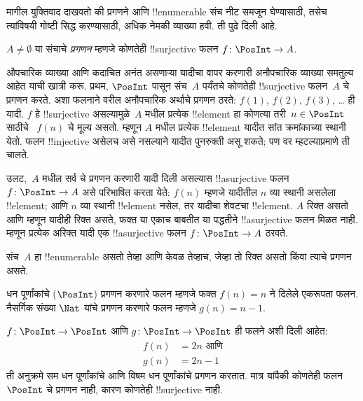 \documentclass[../../../include/open-logic-section]{subfiles}
\begin{document}
मागील युक्तिवाद दाखवतो की प्रगणने आणि !!{enumerable} संच नीट
समजून घेण्यासाठी, तसेच त्यांविषयी गोष्टी सिद्ध करण्यासाठी,
अधिक नेमकी व्याख्या हवी. ती पुढे दिली आहे.

\begin{defn}
$A \neq \emptyset$ या संचाचे \emph{प्रगणन} म्हणजे कोणतेही
!!{surjective} फलन $f \colon \PosInt \to A$.
\end{defn}

\begin{explain}
औपचारिक व्याख्या आणि कदाचित अनंत असणाऱ्या यादीचा वापर करणारी
अनौपचारिक व्याख्या समतुल्य आहेत याची खात्री करू. प्रथम, $\PosInt$
पासून संच~$A$ पर्यंतचे कोणतेही !!{surjective} फलन~$A$ चे प्रगणन करते.
अशा फलनाने वरील अनौपचारिक अर्थाचे प्रगणन ठरते: $f(1)$, $f(2)$,
$f(3)$, \dots{} ही यादी. $f$ हे !!{surjective} असल्यामुळे~$A$
मधील प्रत्येक !!{element} हा कोणत्या तरी~$n \in \PosInt$ साठीचे
~$f(n)$ चे मूल्य असतो. म्हणून $A$ मधील प्रत्येक !!{element} यादीत
सांत क्रमांकाच्या स्थानी येतो. फलन !!{injective} असेलच असे नसल्याने
यादीत पुनरुक्ती असू शकते; पण वर म्हटल्याप्रमाणे ती चालते.

उलट,~$A$ मधील सर्व चे प्रगणन करणारी यादी दिली असल्यास
!!a{surjective} फलन $f\colon \PosInt \to A$ असे परिभाषित करता येते:
$f(n)$ म्हणजे यादीतील $n$ व्या स्थानी असलेला !!{element}; आणि
$n$ व्या स्थानी !!{element} नसेल, तर यादीचा शेवटचा !!{element}.
$A$ रिक्त असतो आणि म्हणून यादीही रिक्त असते, फक्त या एकाच बाबतीत
या पद्धतीने !!a{surjective} फलन मिळत नाही. म्हणून प्रत्येक अरिक्त
यादी एक !!a{surjective} फलन $f\colon \PosInt \to A$ ठरवते.
\end{explain}

\begin{defn}
  संच~$A$ हा !!{enumerable} असतो तेव्हा आणि केवळ तेव्हाच,
  जेव्हा तो रिक्त असतो किंवा त्याचे प्रगणन असते.
\end{defn}

\begin{ex}
धन पूर्णांकांचे ($\PosInt$) प्रगणन करणारे फलन म्हणजे फक्त
$f(n) = n$ ने दिलेले एकरूपता फलन. नैसर्गिक संख्या $\Nat$ यांचे
प्रगणन करणारे फलन म्हणजे $g(n) = n - 1$.
\end{ex}

\begin{ex}
$f\colon \PosInt \to \PosInt$ आणि $g \colon \PosInt \to \PosInt$
ही फलने अशी दिली आहेत:
\begin{align*}
f(n) & = 2n \text{ आणि}\\
g(n) & = 2n - 1
\end{align*}
ती अनुक्रमे सम धन पूर्णांकांचे आणि विषम धन पूर्णांकांचे प्रगणन करतात.
मात्र यांपैकी कोणतेही फलन $\PosInt$ चे प्रगणन नाही, कारण कोणतेही
!!{surjective} नाही.
\end{ex}
\end{document}
